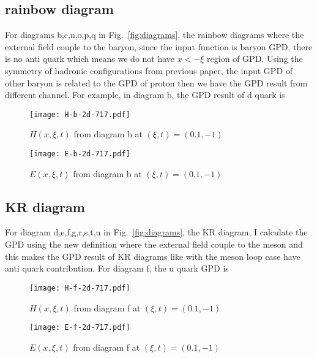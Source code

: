 \documentclass[preprintnumbers,prd,superscriptaddress,preprint]{revtex4-1}
\begin{document}
	\subsection{rainbow diagram}
	For diagrams b,c,n,o,p,q in Fig.~\ref{fig:diagrams}, the rainbow diagrams where the external field couple to the baryon, since the input function is baryon GPD, there is no anti quark which means we do not have $x<-\xi$ region of GPD. Using the symmetry of hadronic configurations from previous paper, the input GPD of other baryon is related to the GPD of proton then we have the GPD result from different channel. For example, in diagram b, the GPD result of d quark is 
	\begin{figure}[h]
		\begin{center}
			\texttt{[image: H-b-2d-717.pdf]}
			\caption{$H(x,\xi,t)$ from diagram b at $(\xi,t)=(0.1,-1)$} 
			\label{H-f-nD}
		\end{center}
	\end{figure}
	\begin{figure}[h]
		\begin{center}
			\texttt{[image: E-b-2d-717.pdf]}
			\caption{$E(x,\xi,t)$ from diagram b at $(\xi,t)=(0.1,-1)$} 
			\label{H-f-nD}
		\end{center}
	\end{figure}
	
	\subsection{KR diagram}
	For diagram d,e,f,g,r,s,t,u in Fig.~\ref{fig:diagrams}, the KR diagram, I calculate the GPD using the new definition where the external field couple to the meson and this makes the GPD result of KR diagrams like with the meson loop case have anti quark contribution. For diagram f, the u quark GPD is  
	\begin{figure}[h]
		\begin{center}
			\texttt{[image: H-f-2d-717.pdf]}
			\caption{$H(x,\xi,t)$ from diagram f at $(\xi,t)=(0.1,-1)$} 
			\label{H-f-nD}
		\end{center}
	\end{figure}
	\begin{figure}[h]
		\begin{center}
			\texttt{[image: E-f-2d-717.pdf]}
			\caption{$E(x,\xi,t)$ from diagram f at $(\xi,t)=(0.1,-1)$} 
			\label{H-f-nD}
		\end{center}
	\end{figure}
	
\end{document}
